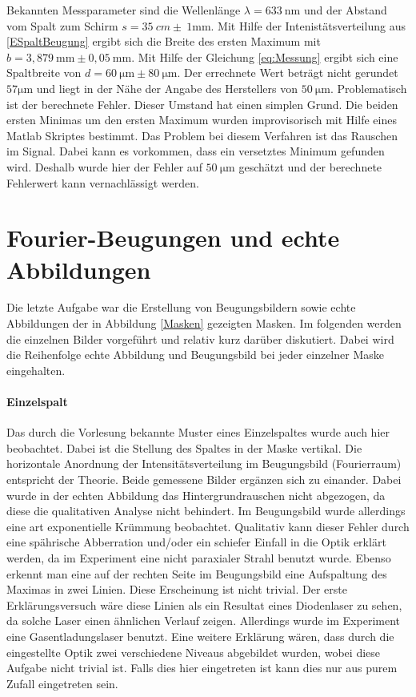 Bekannten Messparameter sind die Wellenlänge $\lambda=633~\mathrm{nm}$ und der Abstand vom Spalt zum Schirm $s=35~cm\pm~\mathrm{1mm}$. Mit Hilfe der Intenistätsverteilung aus \ref{ESpaltBeugung} ergibt sich die Breite des ersten Maximum mit $b=3,879~\mathrm{mm}\pm 0,05~\mathrm{mm}$. Mit Hilfe der Gleichung \eqref{eq:Messung} ergibt sich eine Spaltbreite von $d=60~\mathrm{\mu m}\pm80~\mathrm{\mu m}$. Der errechnete Wert beträgt nicht gerundet $57\mathrm{\mu m}$ und liegt in der Nähe der Angabe des Herstellers von $50~\mathrm{\mu m}$. Problematisch ist der berechnete Fehler. Dieser Umstand hat einen simplen Grund. Die beiden ersten Minimas um den ersten Maximum wurden improvisorisch mit Hilfe eines Matlab Skriptes bestimmt. Das Problem bei diesem Verfahren ist das Rauschen im Signal. Dabei kann es vorkommen, dass ein versetztes Minimum gefunden wird. Deshalb wurde hier der Fehler auf $50~\mathrm{\mu m}$ geschätzt und der berechnete Fehlerwert kann vernachlässigt werden.

\section{Fourier-Beugungen und echte Abbildungen}
Die letzte Aufgabe war die Erstellung von Beugungsbildern sowie echte Abbildungen der in Abbildung \ref{Masken} gezeigten Masken. Im folgenden werden die einzelnen Bilder vorgeführt und relativ kurz darüber diskutiert. Dabei wird die Reihenfolge echte Abbildung und Beugungsbild bei jeder einzelner Maske eingehalten.
\paragraph{Einzelspalt} Das durch die Vorlesung bekannte Muster eines Einzelspaltes wurde auch hier beobachtet. Dabei ist die Stellung des Spaltes in der Maske vertikal. Die horizontale Anordnung der Intensitätsverteilung im Beugungsbild (Fourierraum) entspricht der Theorie. Beide gemessene Bilder ergänzen sich zu einander. Dabei wurde in der echten Abbildung das Hintergrundrauschen nicht abgezogen, da diese die qualitativen Analyse nicht behindert. Im Beugungsbild wurde allerdings eine art exponentielle Krümmung beobachtet. Qualitativ kann dieser Fehler durch eine spährische Abberration und/oder ein schiefer Einfall in die Optik erklärt werden, da im Experiment eine nicht paraxialer Strahl benutzt wurde. Ebenso erkennt man eine auf der rechten Seite im Beugungsbild eine Aufspaltung des Maximas in zwei Linien. Diese Erscheinung ist nicht trivial. Der erste Erklärungsversuch wäre diese Linien als ein Resultat eines Diodenlaser zu sehen, da solche Laser einen ähnlichen Verlauf zeigen. Allerdings wurde im Experiment eine Gasentladungslaser benutzt. Eine weitere Erklärung wären, dass durch die eingestellte Optik zwei verschiedene Niveaus abgebildet wurden, wobei diese Aufgabe nicht trivial ist. Falls dies hier eingetreten ist kann dies nur aus purem Zufall eingetreten sein.

